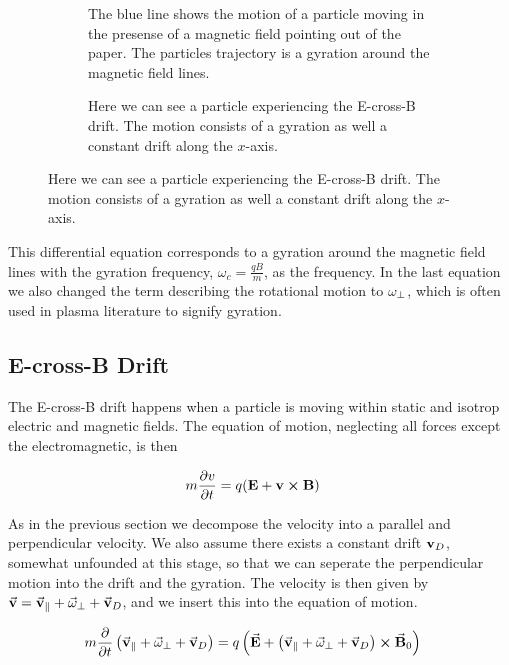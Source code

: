 		\begin{figure}
			\centering
			\begin{subfigure}{0.45\textwidth}
				
				\caption{The blue line shows the motion of a particle moving in the presense of a magnetic
				field pointing out of the paper. The particles trajectory is a gyration around the magnetic field lines.}
			\end{subfigure}
			\begin{subfigure}{0.45\textwidth}
				\caption{Here we can see a particle experiencing the E-cross-B drift. The motion consists of a gyration
				as well a constant drift along the \(x\)-axis.}
			\end{subfigure}
		\end{figure}


		This differential equation corresponds to a gyration around the magnetic field lines
		with the gyration frequency, \(\omega_c = \frac{qB}{m}\), as the frequency.
		In the last equation we also changed the term describing the rotational motion
		to \(\vb{\omega}_\perp\), which is often used in plasma literature to
		signify gyration.

	\subsection{E-cross-B Drift}
	The E-cross-B drift happens when a particle is moving within static and isotrop
	electric and magnetic fields. The equation of motion, neglecting all forces
	except the electromagnetic, is then

	\begin{align}
		m\pdv{v}{t} &= q(\vb{E} + \vb{v}\cross\vb{B}) \label{eq:EcrossB}
	\end{align}

	As in the previous section we decompose the velocity into a parallel and perpendicular
 	velocity. We also assume there exists a constant drift \(\vb{v}_D\), somewhat unfounded at this stage,
	so that we can seperate the perpendicular motion into the drift and the gyration.
	The velocity is then given by \(\va{v} = \va{v}_\parallel + \va{\omega}_\perp + \va{v}_D\),
	and we insert this into the equation of motion.

	\begin{align}
		m\pdv{}{t}\left( \va{v}_\parallel + \va{\omega}_\perp + \va{v}_D\right) &=
		q \left( \va{E} +   \left( \va{v}_\parallel + \va{\omega}_\perp +
		\va{v}_D \right)  \cross \va{B}_0 \right)
	\end{align}


